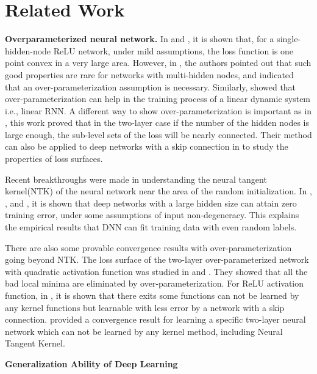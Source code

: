 \documentclass{article}
\begin{document}
\section{Related Work}
{\bf Overparameterized neural network.}
In \cite{tian2017symmetry-breaking} and \cite{du2018when}, it is shown that, for a  single-hidden-node ReLU network, under mild assumptions, the loss function is one point convex in a very large area. However, in \cite{safran2018spurious}, the authors pointed out that such good properties are rare for networks with multi-hidden nodes, and indicated that an over-parameterization assumption is necessary. Similarly, \cite{2016Gradient} showed that over-parameterization can help in the training process of a linear dynamic system i.e., linear RNN. A different way to show over-parameterization is important as in  \cite{freeman2016topology}, this work proved that in the two-layer case if the number of the hidden nodes is large enough, the sub-level sets of the loss will be nearly connected. Their method can also be applied to deep networks with a skip connection in \cite{ijcai2020-387} to study the properties of loss surfaces.

Recent breakthroughs were made in understanding the neural tangent kernel(NTK)  \cite{NEURIPS20185a4be1fa, alemohammad2021the} of the neural network near the area of the random initialization. In \cite{NEURIPS201854fe976b}, \cite{DBLP}, \cite{allenzhu2019convergence} and \cite{rate}, it is shown that deep networks with a large hidden size can attain zero training error, under some assumptions of input non-degeneracy. This explains the empirical results \cite{zhang2017understanding} that DNN can fit training data with even random labels.

There are also some provable convergence results with over-parameterization going beyond NTK. The loss surface of the two-layer over-parameterized network with quadratic activation function was studied in \cite{du2018on} and \cite{MahdiTheoretical}. They showed that all the bad local minima are eliminated by over-parameterization. For ReLU activation function, in \cite{NEURIPS2019_5857d68c}, it is shown that there exits some functions can not be learned by any kernel functions but learnable with less error by a network with a skip connection. \cite{ li2020learning} provided a convergence result for learning a specific two-layer neural network which can not be learned by any kernel method, including Neural Tangent Kernel.

{\bf Generalization Ability of Deep Learning}
\end{document}
